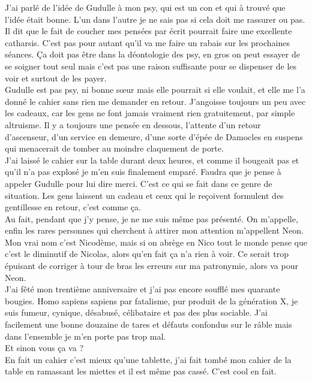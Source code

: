 J'ai parlé de l'idée de Gudulle à mon psy, qui est un con et qui à trouvé que l'idée était bonne. L'un dans l'autre je ne sais pas si cela doit me rassurer ou pas. Il dit que le fait de coucher mes pensées par écrit pourrait faire une excellente catharsis. C'est pas pour autant qu'il va me faire un rabais sur les prochaines séances. Ça doit pas être dans la déontologie des psy, en gros on peut essayer de se soigner tout seul mais c'est pas une raison suffisante pour se dispenser de les voir et surtout de les payer.\\
Gudulle est pas psy, ni bonne sœur mais elle pourrait si elle voulait, et elle me l'a donné le cahier sans rien me demander en retour. J'angoisse toujours un peu avec les cadeaux, car les gens ne font jamais vraiment rien gratuitement, par simple altruisme. Il y a toujours une pensée en dessous, l'attente d'un retour d'ascenseur, d'un service en demeure, d'une sorte d'épée de Damocles en suspens qui menacerait de tomber au moindre claquement de porte.\\

J'ai laissé le cahier sur la table durant deux heures, et comme il bougeait pas et qu'il n'a pas explosé je m'en suis finalement emparé. Faudra que je pense à appeler Gudulle pour lui dire merci. C'est ce qui se fait dans ce genre de situation. Les gens laissent un cadeau et ceux qui le reçoivent formulent des gentillesse en retour, c'est comme ça.\\

Au fait, pendant que j'y pense, je ne me suis même pas présenté. On m'appelle, enfin les rares personnes qui cherchent à attirer mon attention m'appellent Neon. Mon vrai nom c'est Nicodème, mais si on abrège en Nico tout le monde pense que c'est le diminutif de Nicolas, alors qu'en fait ça n'a rien à voir. Ce serait trop épuisant de corriger à tour de bras les erreurs sur ma patronymie, alors va pour Neon. \\
J'ai fêté mon trentième anniversaire et j'ai pas encore soufflé mes quarante bougies. Homo sapiens sapiens par fatalisme, pur produit de la génération X, je suis fumeur, cynique, désabusé, célibataire et pas des plus sociable. J'ai facilement une bonne douzaine de tares et défauts confondus sur le râble mais dans l'ensemble je m'en porte pas trop mal. \\

Et sinon vous ça va ? \\

En fait un cahier c'est mieux qu'une tablette, j'ai fait tombé mon cahier de la table en ramassant les miettes et il est même pas cassé. C'est cool en fait.